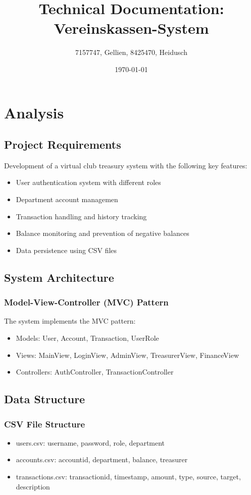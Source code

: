 \documentclass[a4paper,11pt]{article}
\title{Technical Documentation: Vereinskassen-System}
\author{7157747, Gellien, 8425470, Heidusch}
\date{\today}
\begin{document}
\maketitle

\section{Analysis}

\subsection{Project Requirements}
Development of a virtual club treasury system with the following key features:
\begin{itemize}
\item User authentication system with different roles
\item Department account managemen
\item Transaction handling and history tracking
\item Balance monitoring and prevention of negative balances
\item Data persistence using CSV files
\end{itemize}

\subsection{System Architecture}
\subsubsection{Model-View-Controller (MVC) Pattern}
The system implements the MVC pattern:
\begin{itemize}
\item Models: User, Account, Transaction, UserRole
\item Views: MainView, LoginView, AdminView, TreasurerView, FinanceView
\item Controllers: AuthController, TransactionController
\end{itemize}

\subsection{Data Structure}
\subsubsection{CSV File Structure}
\begin{itemize}
\item users.csv: username, password, role, department
\item accounts.csv: accountid, department, balance, treasurer
\item transactions.csv: transactionid, timestamp, amount, type, source, target, description
\end{itemize}
\end{document}
